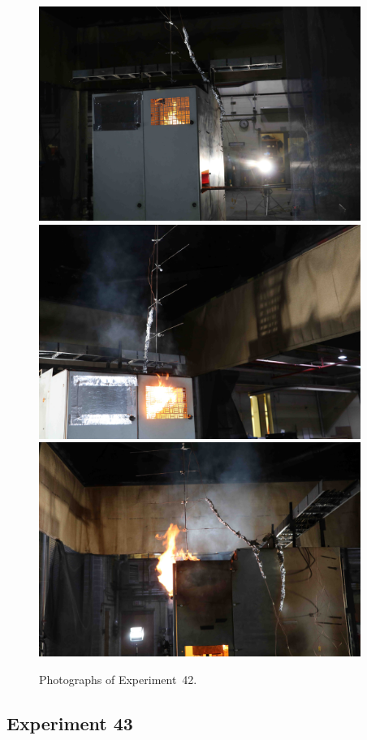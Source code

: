 \documentclass[12pt]{article}
\begin{document}
\begin{figure}[p]
\centering
\includegraphics[height=2.75in]{../FIGURES/Test_42_start} \\
\includegraphics[height=2.75in]{../FIGURES/Test_42_rear} \\
\includegraphics[height=2.75in]{../FIGURES/Test_42_side}
\caption[Photographs of Experiment~42]{Photographs of Experiment~42.}
\label{fig:Test_42_photos}
\end{figure}


\clearpage

\subsection{Experiment 43}
\end{document}
